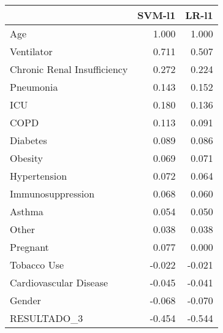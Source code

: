 \begin{tabular}{lrr}
\toprule
{} &  SVM-l1 &  LR-l1 \\
\midrule
Age                         &   1.000 &  1.000 \\
Ventilator                  &   0.711 &  0.507 \\
Chronic Renal Insufficiency &   0.272 &  0.224 \\
Pneumonia                   &   0.143 &  0.152 \\
ICU                         &   0.180 &  0.136 \\
COPD                        &   0.113 &  0.091 \\
Diabetes                    &   0.089 &  0.086 \\
Obesity                     &   0.069 &  0.071 \\
Hypertension                &   0.072 &  0.064 \\
Immunosuppression           &   0.068 &  0.060 \\
Asthma                      &   0.054 &  0.050 \\
Other                       &   0.038 &  0.038 \\
Pregnant                    &   0.077 &  0.000 \\
Tobacco Use                 &  -0.022 & -0.021 \\
Cardiovascular Disease      &  -0.045 & -0.041 \\
Gender                      &  -0.068 & -0.070 \\
RESULTADO\_3                 &  -0.454 & -0.544 \\
\bottomrule
\end{tabular}
